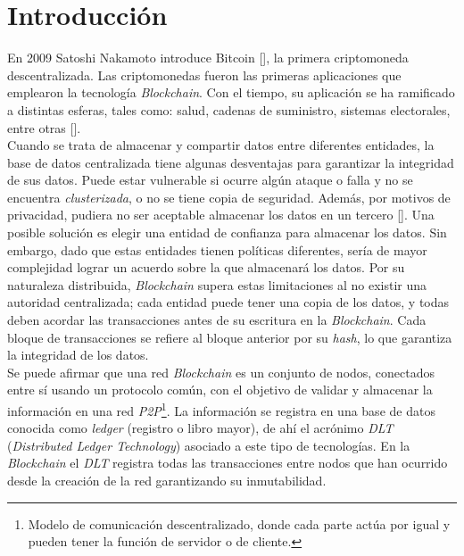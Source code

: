 \chapter*{Introducción}\label{chapter:introduction}


En 2009 Satoshi Nakamoto introduce Bitcoin [\cite{nakamoto2008bitcoin}], la primera criptomoneda descentralizada. Las criptomonedas fueron las primeras aplicaciones que emplearon la tecnolog\'ia \emph{Blockchain}. Con el tiempo, su aplicaci\'on se ha ramificado a distintas esferas, tales como: salud, cadenas de suministro, sistemas electorales, entre otras [\cite{tama2017critical}].\\

Cuando se trata de almacenar y compartir datos entre diferentes entidades, la base de datos centralizada tiene algunas desventajas para garantizar la integridad de sus datos. Puede estar vulnerable si ocurre alg\'un ataque o falla y no se encuentra \emph{clusterizada}, o no se tiene copia de seguridad. Adem\'as, por motivos de privacidad, pudiera no ser aceptable almacenar los datos en un tercero [\cite{xu2017taxonomy}]. Una posible soluci\'on es elegir una entidad de confianza para almacenar los datos. Sin embargo, dado que estas entidades tienen pol\'iticas diferentes, ser\'ia de mayor complejidad lograr un acuerdo sobre la que almacenar\'a los datos. Por su naturaleza distribuida, \emph{Blockchain} supera estas limitaciones al no existir una autoridad centralizada; cada entidad puede tener una copia de los datos, y todas deben acordar las transacciones antes de su escritura en la \emph{Blockchain}. Cada bloque de transacciones se refiere al bloque anterior por su \emph{hash}, lo que garantiza la integridad de los datos.\\

Se puede afirmar que una red \emph{Blockchain} es un conjunto de nodos, conectados entre s\'i usando un protocolo com\'un, con el objetivo de validar y almacenar la informaci\'on en una red \emph{P2P}\footnote{Modelo de comunicaci\'on descentralizado, donde cada parte act\'ua por igual y pueden tener la funci\'on de servidor o de cliente.}. La informaci\'on se registra en una base de datos conocida como \emph{ledger} (registro o libro mayor), de ah\'i el acr\'onimo \emph{DLT} (\emph{Distributed Ledger Technology}) asociado a este tipo de tecnolog\'ias. En la \emph{Blockchain} el \emph{DLT} registra todas las transacciones entre nodos que han ocurrido desde la creaci\'on de la red garantizando su inmutabilidad.\\

